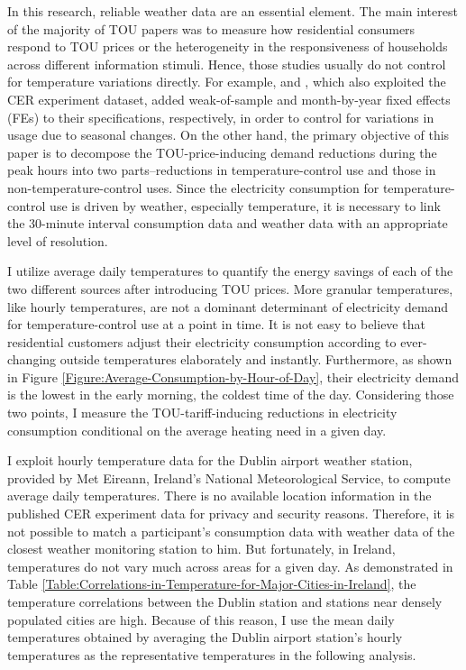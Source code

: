 In this research, reliable weather data are an essential element. The main interest of the majority of TOU papers was to measure how residential consumers respond to TOU prices or the heterogeneity in the responsiveness of households across different information stimuli. Hence, those studies usually do not control for temperature variations directly. For example, \cite{The-Effect-of-Information-on-TOU-Electricity-Use:An-Irish-Residential-Study} and \cite{Peaking-Interest:How-Awareness-Drives-the-Effectiveness-of-Time-of-Use-Electricity-Pricing}, which also exploited the CER experiment dataset, added weak-of-sample and month-by-year fixed effects (FEs) to their specifications, respectively, in order to control for variations in usage due to seasonal changes. On the other hand, the primary objective of this paper is to decompose the TOU-price-inducing demand reductions during the peak hours into two parts--reductions in temperature-control use and those in non-temperature-control uses. Since the electricity consumption for temperature-control use is driven by weather, especially temperature, it is necessary to link the 30-minute interval consumption data and weather data with an appropriate level of resolution. 

I utilize average daily temperatures to quantify the energy savings of each of the two different sources after introducing TOU prices. More granular temperatures, like hourly temperatures, are not a dominant determinant of electricity demand for temperature-control use at a point in time. It is not easy to believe that residential customers adjust their electricity consumption according to ever-changing outside temperatures elaborately and instantly. Furthermore, as shown in Figure \ref{Figure:Average-Consumption-by-Hour-of-Day}, their electricity demand is the lowest in the early morning, the coldest time of the day. Considering those two points, I measure the TOU-tariff-inducing reductions in electricity consumption conditional on the average heating need in a given day. 

I exploit hourly temperature data for the Dublin airport weather station, provided by Met Eireann, Ireland's National Meteorological Service, to compute average daily temperatures. There is no available location information in the published CER experiment data for privacy and security reasons. Therefore, it is not possible to match a participant's consumption data with weather data of the closest weather monitoring station to him. But fortunately, in Ireland, temperatures do not vary much across areas for a given day. As demonstrated in Table \ref{Table:Correlations-in-Temperature-for-Major-Cities-in-Ireland}, the temperature correlations between the Dublin station and stations near densely populated cities are high. Because of this reason, I use the mean daily temperatures obtained by averaging the Dublin airport station's hourly temperatures as the representative temperatures in the following analysis. 

